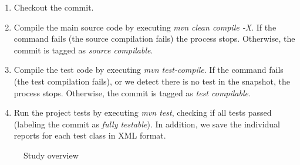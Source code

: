 \begin{enumerate}
    \item Checkout the commit.
    \item Compile the main source code by executing \textit{mvn clean compile -X}. If the command fails (the source compilation fails) the process stops. Otherwise, the commit is tagged as \textit{source compilable}.
    \item Compile the test code by executing \textit{mvn test-compile}. If the command fails (the test compilation fails), or we detect there is no test in the snapshot, the process stops. Otherwise, the commit is tagged as \textit{test compilable}.
    \item Run the project tests by executing \textit{mvn test}, checking if all tests passed (labeling the commit as \textit{fully testable}).
    In addition, we save the individual reports for each test class in XML format.
\end{enumerate}


\begin{figure}[h!]
    \centering    
    
    \caption{Study overview }
    \label{fig:methodology-process}
\end{figure}

